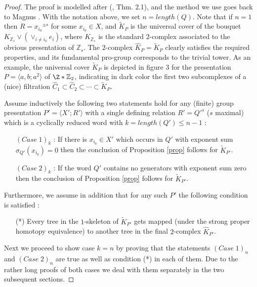\documentclass{amsart}[12pt]
\theoremstyle{definition}
\theoremstyle{remark}
\numberwithin{equation}{section}
\begin{document}
\begin{proof} The proof is modelled after
(\cite{DV}, Thm. 2.1), and the method we use goes back to Magnus
\cite{M}. With the notation above, we set $n= length(Q)$. Note
that if $n=1$ then $R={x_{i_0}}^{\pm s}$ for some $x_{i_0} \in X$,
and $\tilde{K}_P$ is the universal cover of the bouquet
$K_{{\mathbb Z}_s} \vee (\vee_{i \neq i_0} e_i)$, where $K_{{\mathbb Z}_s}$ is
the standard $2$-complex associated to the obvious presentation of
${\mathbb Z}_s$. The $2$-complex $\widehat{K}_P= \tilde{K}_P$ clearly
satisfies the required properties, and its fundamental pro-group
corresponds to the trivial tower. As an example, the universal
cover $\tilde{K}_P$ is depicted in figure 3 for the presentation
$P =\langle a,b ; a^2 \rangle$ of $\Z*{\mathbb Z}_2$, indicating in
dark color the first two subcomplexes of a (nice) filtration
$\widehat{C}_1 {\subset} \widehat{C}_2 {\subset} \cdots {\subset} \tilde{K}_P$.\\
\begin{figure}
\centerline{}
\vspace{-5mm} \label{figure3} \caption{}
\end{figure}
\indent Assume inductively the following two statements hold for
any (finite) group presentation $P' = \langle X' ; R' \rangle$
with a single defi\-ning relation $R'={Q'}^s$ ($s$ maximal) which
is a
cyclically reduced word with $k=length(Q') \leq n-1$ :\\
\begin{itemize}
\item[$(Case \; 1)_k$ :] If there is $x_{i_0} \in X'$ which occurs in
$Q'$ with exponent sum $\sigma_{Q'}(x_{i_0})=0$ then the
conclusion
of Proposition \ref{prop} follows for $\tilde{K}_{P'}$.\\
\item[$(Case \; 2)_k$ :] If the word $Q'$ contains no generators with
exponent sum zero then the conclusion of Proposition \ref{prop}
follows for $\tilde{K}_{P'}$.
\end{itemize}
Furthermore, we assume in addition that for any such $P'$ the
following condition is satisfied :
\begin{itemize}
\item[(*)] Every tree in the $1$-skeleton of $\tilde{K}_{P'}$ gets
mapped (under the strong proper homotopy equivalence) to another
tree in the final $2$-complex $\widehat{K}_{P'}$.
\end{itemize}

\indent Next we proceed to show case $k=n$ by proving that the
statements $(Case \; 1)_n$ and $(Case \; 2)_n$ are true as well as
condition (*) in each of them. Due to the rather long proofs of
both cases we deal with them separately in the two subsequent
sections.
\end{proof}
\end{document}
